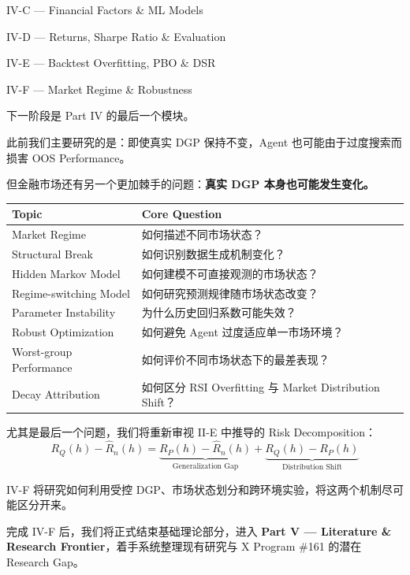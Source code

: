 IV-C --- Financial Factors \& ML Models

IV-D --- Returns, Sharpe Ratio \& Evaluation

IV-E --- Backtest Overfitting, PBO \& DSR

IV-F --- Market Regime \& Robustness

下一阶段是 Part IV 的最后一个模块。

此前我们主要研究的是：即使真实 DGP 保持不变，Agent 也可能由于过度搜索而损害 OOS Performance。

但金融市场还有另一个更加棘手的问题：\textbf{真实 DGP 本身也可能发生变化。}

\begin{readertable}
\begin{longtable}[]{@{}
  >{\raggedright\arraybackslash}p{}
  >{\raggedright\arraybackslash}p{}@{}}
\toprule
Topic & Core Question \\
\midrule
\endhead
Market Regime & 如何描述不同市场状态？ \\
Structural Break & 如何识别数据生成机制变化？ \\
Hidden Markov Model & 如何建模不可直接观测的市场状态？ \\
Regime-switching Model & 如何研究预测规律随市场状态改变？ \\
Parameter Instability & 为什么历史回归系数可能失效？ \\
Robust Optimization & 如何避免 Agent 过度适应单一市场环境？ \\
Worst-group Performance & 如何评价不同市场状态下的最差表现？ \\
Decay Attribution & 如何区分 RSI Overfitting 与 Market Distribution Shift？ \\
\bottomrule
\end{longtable}
\end{readertable}

尤其是最后一个问题，我们将重新审视 II-E 中推导的 Risk Decomposition：
\[\boxed{
R_Q(h)-\widehat R_n(h)
=
\underbrace{
R_P(h)-\widehat R_n(h)
}_{\text{Generalization Gap}}
+
\underbrace{
R_Q(h)-R_P(h)
}_{\text{Distribution Shift}}
}\]

IV-F 将研究如何利用受控 DGP、市场状态划分和跨环境实验，将这两个机制尽可能区分开来。

完成 IV-F 后，我们将正式结束基础理论部分，进入 \textbf{Part V --- Literature \& Research Frontier}，着手系统整理现有研究与 X Program \#161 的潜在 Research Gap。
